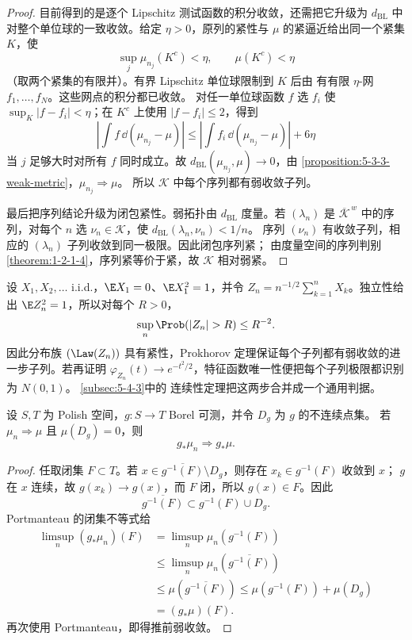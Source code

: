 \begin{proof}
目前得到的是逐个 Lipschitz 测试函数的积分收敛，还需把它升级为
$d_{\mathrm{BL}}$ 中对整个单位球的一致收敛。给定 $\eta>0$，原列的紧性与
$\mu$ 的紧逼近给出同一个紧集 $K$，使
\[
 \sup_j\mu_{n_j}(K^c)<\eta,\qquad \mu(K^c)<\eta
\]
（取两个紧集的有限并）。有界 Lipschitz 单位球限制到 $K$ 后由
\ArzelaAscoli{} 有有限 $\eta$-网 $f_1,\ldots,f_N$。这些网点的积分都已收敛。
对任一单位球函数 $f$ 选 $f_i$ 使 $\sup_K|f-f_i|<\eta$；在 $K^c$ 上使用
$|f-f_i|\le2$，得到
\[
 \left|\int f\,\dd(\mu_{n_j}-\mu)\right|
 \le
 \left|\int f_i\,\dd(\mu_{n_j}-\mu)\right|+6\eta
\]
当 $j$ 足够大时对所有 $f$ 同时成立。故
$d_{\mathrm{BL}}(\mu_{n_j},\mu)\to0$，由
\cref{proposition:5-3-3-weak-metric}，$\mu_{n_j}\Rightarrow\mu$。
所以 $\mathcal K$ 中每个序列都有弱收敛子列。

最后把序列结论升级为闭包紧性。弱拓扑由 $d_{\mathrm{BL}}$ 度量。若
$(\lambda_n)$ 是 $\overline{\mathcal K}^{\,w}$ 中的序列，对每个 $n$ 选
$\nu_n\in\mathcal K$，使 $d_{\mathrm{BL}}(\lambda_n,\nu_n)<1/n$。
序列 $(\nu_n)$ 有收敛子列，相应的 $(\lambda_n)$ 子列收敛到同一极限。因此闭包序列紧；
由度量空间的序列判别\cref{theorem:1-2-1-4}，序列紧等价于紧，故
$\mathcal K$ 相对弱紧。
\end{proof}

\begin{example}[中心极限定理中的紧性]\label{ex:5-3-3-2}
设 $X_1,X_2,\ldots$ i.i.d.，$\E X_1=0$、$\E X_1^2=1$，并令
$Z_n=n^{-1/2}\sum_{k=1}^nX_k$。独立性给出 $\E Z_n^2=1$，所以对每个 $R>0$，
\[
 \sup_n\Prob(|Z_n|>R)\leq R^{-2}.
\]
因此分布族 $(\Law(Z_n))$ 具有紧性，Prokhorov 定理保证每个子列都有弱收敛的进一步子列。若再证明
$\varphi_{Z_n}(t)\to e^{-t^2/2}$，特征函数唯一性便把每个子列极限都识别为 $N(0,1)$。
\cref{subsec:5-4-3}中的 \Levy{} 连续性定理把这两步合并成一个通用判据。
\end{example}

\begin{proposition}[几乎处处连续的推前]\label{proposition:5-3-3-3}
设 $S,T$ 为 Polish 空间，$g:S\to T$ Borel 可测，并令 $D_g$ 为 $g$ 的不连续点集。
若 $\mu_n\Rightarrow\mu$ 且 $\mu(D_g)=0$，则
\[
 g_*\mu_n\Rightarrow g_*\mu.
\]
\end{proposition}

\begin{proof}
任取闭集 $F\subset T$。若
$x\in\overline{g^{-1}(F)}\setminus D_g$，则存在 $x_k\in g^{-1}(F)$ 收敛到 $x$；
$g$ 在 $x$ 连续，故 $g(x_k)\to g(x)$，而 $F$ 闭，所以 $g(x)\in F$。因此
\[
 \overline{g^{-1}(F)}
 \subset g^{-1}(F)\cup D_g.
\]
Portmanteau 的闭集不等式给
\[
\begin{aligned}
 \limsup_n(g_*\mu_n)(F)
 &=\limsup_n\mu_n(g^{-1}(F))\\
 &\le\limsup_n\mu_n(\overline{g^{-1}(F)})\\
 &\le\mu(\overline{g^{-1}(F)})
 \le\mu(g^{-1}(F))+\mu(D_g)\\
 &=(g_*\mu)(F).
\end{aligned}
\]
再次使用 Portmanteau，即得推前弱收敛。
\end{proof}

